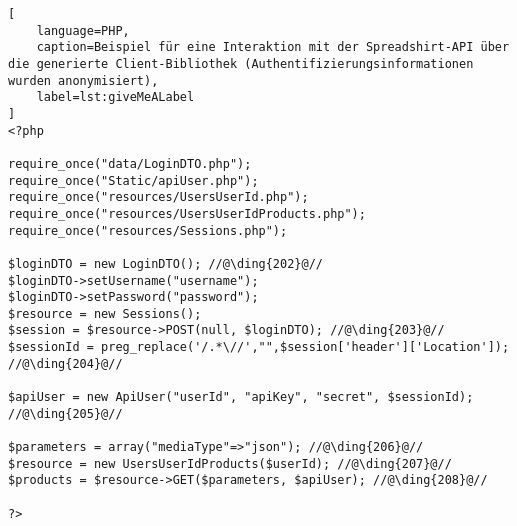 \begin{lstlisting}[
    language=PHP,
    caption=Beispiel für eine Interaktion mit der Spreadshirt-API über die generierte Client-Bibliothek (Authentifizierungsinformationen wurden anonymisiert),
    label=lst:giveMeALabel
]
<?php

require_once("data/LoginDTO.php");
require_once("Static/apiUser.php");
require_once("resources/UsersUserId.php");
require_once("resources/UsersUserIdProducts.php");
require_once("resources/Sessions.php");

$loginDTO = new LoginDTO(); //@\ding{202}@//
$loginDTO->setUsername("username");
$loginDTO->setPassword("password");
$resource = new Sessions();
$session = $resource->POST(null, $loginDTO); //@\ding{203}@//
$sessionId = preg_replace('/.*\//',"",$session['header']['Location']); //@\ding{204}@//

$apiUser = new ApiUser("userId", "apiKey", "secret", $sessionId); //@\ding{205}@//

$parameters = array("mediaType"=>"json"); //@\ding{206}@//
$resource = new UsersUserIdProducts($userId); //@\ding{207}@//
$products = $resource->GET($parameters, $apiUser); //@\ding{208}@//

?>
\end{lstlisting}

